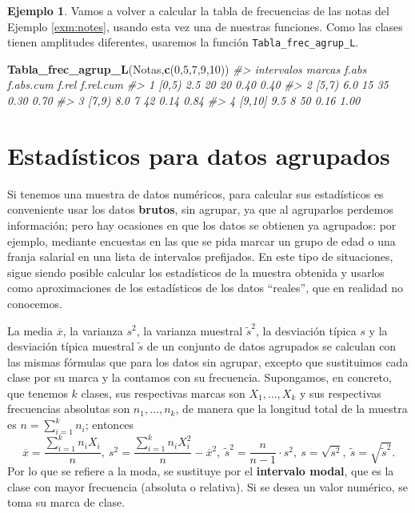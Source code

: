 \documentclass[
]{book}
\newenvironment{Shaded}{\begin{snugshade}}{\end{snugshade}}
\newcommand{\CommentTok}[1]{\textcolor[rgb]{0.56,0.35,0.01}{\textit{#1}}}
\newcommand{\DecValTok}[1]{\textcolor[rgb]{0.00,0.00,0.81}{#1}}
\newcommand{\KeywordTok}[1]{\textcolor[rgb]{0.13,0.29,0.53}{\textbf{#1}}}
\newcommand{\NormalTok}[1]{#1}
\theoremstyle{definition}
\theoremstyle{definition}
\newtheorem{example}{Ejemplo}[chapter]
\theoremstyle{definition}
\theoremstyle{remark}
\begin{document}
\begin{example}
\protect\hypertarget{exm:unnamed-chunk-55}{}{\label{exm:unnamed-chunk-55} }Vamos a volver a calcular la tabla de frecuencias de las notas del Ejemplo \ref{exm:notes}, usando esta vez una de nuestras funciones. Como las clases tienen amplitudes diferentes, usaremos la función \texttt{Tabla\_frec\_agrup\_L}.
\end{example}

\begin{Shaded}
\begin{Highlighting}[]
\KeywordTok{Tabla\_frec\_agrup\_L}\NormalTok{(Notas,}\KeywordTok{c}\NormalTok{(}\DecValTok{0}\NormalTok{,}\DecValTok{5}\NormalTok{,}\DecValTok{7}\NormalTok{,}\DecValTok{9}\NormalTok{,}\DecValTok{10}\NormalTok{))}
\CommentTok{\#\textgreater{}   intervalos marcas f.abs f.abs.cum f.rel f.rel.cum}
\CommentTok{\#\textgreater{} 1      [0,5)    2.5    20        20  0.40      0.40}
\CommentTok{\#\textgreater{} 2      [5,7)    6.0    15        35  0.30      0.70}
\CommentTok{\#\textgreater{} 3      [7,9)    8.0     7        42  0.14      0.84}
\CommentTok{\#\textgreater{} 4     [9,10]    9.5     8        50  0.16      1.00}
\end{Highlighting}
\end{Shaded}

\hypertarget{estaduxedsticos-para-datos-agrupados}{%
\section{Estadísticos para datos agrupados}\label{estaduxedsticos-para-datos-agrupados}}

Si tenemos una muestra de datos numéricos, para calcular sus estadísticos es conveniente usar los datos \textbf{brutos}, sin agrupar, ya que al agruparlos perdemos información; pero hay ocasiones en que los datos se obtienen ya agrupados: por ejemplo, mediante encuestas en las que se pida marcar un grupo de edad o una franja salarial en una lista de intervalos prefijados. En este tipo de situaciones, sigue siendo posible calcular los estadísticos de la muestra obtenida y usarlos como aproximaciones de los estadísticos de los datos ``reales'', que en realidad no conocemos.

La media \(\overline{x}\), la varianza \(s^2\), la varianza muestral \(\tilde{s}^2\), la desviación típica \(s\) y la desviación típica muestral \(\tilde{s}\) de un conjunto de datos agrupados se calculan con las mismas fórmulas que para los datos sin agrupar, excepto que sustituimos cada clase por su marca y la contamos con su frecuencia. Supongamos, en concreto, que tenemos \(k\) clases, sus respectivas marcas son \(X_1,\ldots,X_k\) y sus respectivas frecuencias absolutas son \(n_1,\ldots,n_k\), de manera que la longitud total de la muestra es
\(n=\sum_{i=1}^k n_i\); entonces
\[
\overline{x}=\frac{\sum_{i=1}^k n_iX_i}{n},\
s^2=\frac{\sum_{i=1}^k n_iX^2_i}{n}-\overline{x}^2,\
\tilde{s}^2=\frac{n}{n-1}\cdot s^2,\
s=\sqrt{s^2},\
\tilde{s}=\sqrt{\widetilde{s}^2}.
\]
Por lo que se refiere a la moda, se sustituye por el \textbf{intervalo modal}, que es la clase con mayor frecuencia (absoluta o relativa). Si se desea un valor numérico, se toma su marca de clase.
\end{document}

